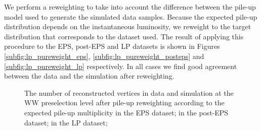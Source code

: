 
We perform a reweighting to take into account the difference 
between the pile-up model used to generate the simulated data samples.
Because the expected pile-up distribution depends on the instantaneous 
luminosity, we reweight to the target distribution that corresponds to 
the dataset used.
The result of applying this procedure to the EPS, post-EPS and LP datasets
is shown in Figures \ref{subfig:lp_pureweight_eps}, \ref{subfig:lp_pureweight_posteps}
and \ref{subfig:lp_pureweight_lp} respectively. 
In all cases we find good agreement between the data and the simulation
after reweighting.

\begin{figure}[!hbtp]
\centering
{}
\caption{The number of reconstructed vertices in data and simulation 
at the WW preselection level after pile-up reweighting
according to the expected pile-up multiplicity
 in the EPS dataset;
 in the post-EPS dataset;
 in the LP dataset;
}
\label{fig:lp_ww0j_dilep}
\end{figure}

